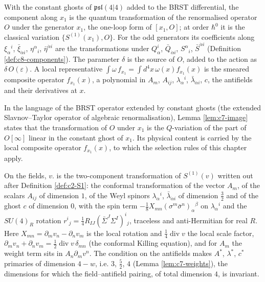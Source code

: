 \begin{remark}
With the constant ghosts of $\mathfrak{psl}(4|4)$ added to the BRST differential, the component along $x_1$ is the quantum transformation of the renormalised operator $O$ under the generator $x_1$, the one-loop form of $[x_1,O]$; at order $\hbar^0$ it is the classical variation $\{S^{(1)}(x_1),O\}$. For the odd generators its coefficients along $\xi_\alpha{}^i$, $\bar\xi_{\dot\alpha i}$, $\eta^\alpha{}_i$, $\bar\eta^{\dot\alpha i}$ are the transformations under $Q^i_\alpha$, $\bar Q_{\dot\alpha i}$, $S^\alpha{}_i$, $\bar S^{\dot\alpha i}$ (Definition \ref{def:c8-components}). The parameter $\delta$ is the source of $O$, added to the action as $\delta\,O(\varepsilon)$. A local representative $\int\omega\,f_{x_1}=\int d^4x\,\omega(x)f_{x_1}(x)$ is the smeared composite operator $f_{x_1}(x)$, a polynomial in $A_m$, $A_{ij}$, $\lambda_\alpha{}^i$, $\bar\lambda_{\dot\alpha i}$, $c$, the antifields and their derivatives at $x$.
\end{remark}

\begin{remark}
In the language of the BRST operator extended by constant ghosts (the extended Slavnov--Taylor operator of algebraic renormalisation), Lemma \ref{lem:c7-image} states that the transformation of $O$ under $x_1$ is the $Q$-variation of the part of $O[\infty]$ linear in the constant ghost of $x_1$. Its physical content is carried by the local composite operator $f_{x_1}(x)$, to which the selection rules of this chapter apply.
\end{remark}

\begin{remark}
On the fields, $v.$ is the two-component transformation of $S^{(1)}(v)$ written out after Definition \ref{def:c2-S1}: the conformal transformation of the vector $A_m$, of the scalars $A_{ij}$ of dimension $1$, of the Weyl spinors $\lambda_\alpha{}^i$, $\bar\lambda_{\dot\alpha i}$ of dimension $\tfrac32$ and of the ghost $c$ of dimension $0$, with the spin term $-\tfrac18X_{mn}(\sigma^m\bar\sigma^n)_\alpha{}^\beta$ on $\lambda_\alpha{}^i$ and the $SU(4)_R$ rotation $r^i{}_j=\tfrac14R_{IJ}(\bar\Sigma^J\Sigma^I)^i{}_j$, traceless and anti-Hermitian for real $R$. Here $X_{mn}=\partial_mv_n-\partial_nv_m$ is the local rotation and $\tfrac14\operatorname{div}v$ the local scale factor, $\partial_mv_n+\partial_nv_m=\tfrac12\operatorname{div}v\,\delta_{mn}$ (the conformal Killing equation), and for $A_m$ the weight term sits in $A_n\partial_mv^n$. The condition on the antifields makes $A^*$, $\lambda^*$, $c^*$ primaries of dimension $4-w$, i.e. $3$, $\tfrac52$, $4$ (Lemma \ref{lem:c7-weights}), the dimensions for which the field--antifield pairing, of total dimension $4$, is invariant.
\end{remark}

